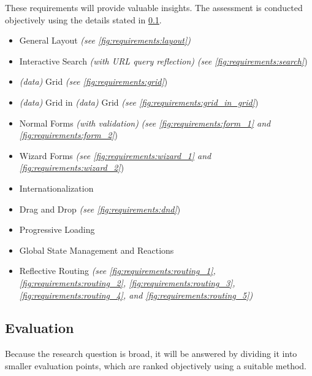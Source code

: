 These requirements will provide valuable insights. The assessment is conducted objectively using the details stated in \ref{subsec:intro:experiment:evaluation}.

\begin{itemize}
    \item General Layout \textit{(see \ref{fig:requirements:layout})}
    \item Interactive Search \textit{(with URL query reflection)} \textit{(see \ref{fig:requirements:search}})
    \item \textit{(data)} Grid \textit{(see \ref{fig:requirements:grid}})
    \item \textit{(data)} Grid in \textit{(data)} Grid \textit{(see \ref{fig:requirements:grid_in_grid}})
    \item Normal Forms \textit{(with validation)} \textit{(see \ref{fig:requirements:form_1} and \ref{fig:requirements:form_2}})
    \item Wizard Forms \textit{(see \ref{fig:requirements:wizard_1} and \ref{fig:requirements:wizard_2}})
    \item Internationalization
    \item Drag and Drop \textit{(see \ref{fig:requirements:dnd}})
    \item Progressive Loading
    \item Global State Management and Reactions
    \item Reflective Routing \textit{(see \ref{fig:requirements:routing_1}, \ref{fig:requirements:routing_2}, \ref{fig:requirements:routing_3}, \ref{fig:requirements:routing_4}, and \ref{fig:requirements:routing_5})}
\end{itemize}

\subsection{Evaluation}
\label{subsec:intro:experiment:evaluation}

Because the research question is broad, it will be answered by dividing it into smaller evaluation points, which are ranked objectively using a suitable method.


